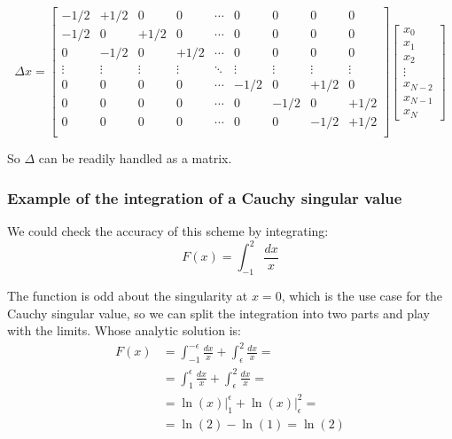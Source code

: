 \begin{equation}
    \Delta x = 
    \begin{bmatrix}
        -1/2 & +1/2 & 0 & 0 &\cdots & 0 & 0 & 0 & 0\\
        -1/2 & 0 & +1/2 & 0 & \cdots & 0 & 0 & 0 & 0\\
        0 &-1/2 & 0 & +1/2 & \cdots & 0 & 0 & 0 & 0\\
        \vdots & \vdots & \vdots & \vdots & \ddots & \vdots & \vdots & \vdots & \vdots \\
        0 & 0 & 0 & 0 & \cdots & -1/2 & 0 & +1/2 & 0 \\
        0 & 0 & 0 & 0 & \cdots & 0 & -1/2 & 0 & +1/2 \\
        0 & 0 & 0 & 0 & \cdots & 0 & 0 & -1/2 & +1/2 \\
    \end{bmatrix}
    \begin{bmatrix}
        x_0 \\
        x_1 \\
        x_2 \\
        \vdots \\
        x_{N-2} \\
        x_{N-1} \\
        x_N
    \end{bmatrix}
\end{equation}

So $\Delta$ can be readily handled as a matrix.

\subsubsection{Example of the integration of a Cauchy singular value}
We could check the accuracy of this scheme by integrating:
\begin{equation}
    F(x) = \int_{-1}^{2}\frac{dx}{x}
\end{equation}

The function is odd about the singularity at $x=0$, which is the use case for the Cauchy singular value, so we can split the integration into two parts and play with the limits.
Whose analytic solution is:
\begin{align}
    F(x)    &= \int_{-1}^{-\epsilon} \frac{dx}{x} + \int_{\epsilon}^{2} \frac{dx}{x} = \\
            &= \int_{1}^{\epsilon} \frac{dx}{x} + \int_{\epsilon}^{2} \frac{dx}{x} = \\
            &= \left. \ln(x) \right|_{1}^{\epsilon} + \left. \ln(x) \right|_{\epsilon}^{2} = \\
            &= \ln(2) - \ln(1) = \ln (2)
\end{align}

